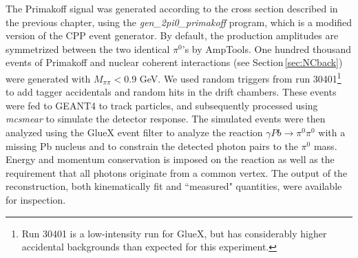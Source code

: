 The Primakoff signal was generated according to the cross section
described in the previous chapter, using the
\emph{gen\_2pi0\_primakoff} program, which is a modified version of the CPP event generator. By default, the production amplitudes are
symmetrized between the two identical $\pi^0$'s by AmpTools. One
hundred thousand events of Primakoff and nuclear coherent interactions 
(see Section\,\ref{sec:NCback}) were generated with $M_{\pi\pi}<$0.9 GeV.
We used random triggers from run 30401\footnote{Run 30401 is a low-intensity run for GlueX,
but has considerably higher accidental backgrounds than expected for this experiment.} to add tagger accidentals 
and random hits in the drift chambers. These events were fed to GEANT4 to track particles, and subsequently
processed using \emph{mcsmear} to simulate the detector response. The
simulated events were then analyzed using the GlueX event filter to
analyze the reaction $\gamma Pb \rightarrow \pi^0 \pi^0$ with a
missing Pb nucleus and to constrain the detected photon pairs to the
$\pi^0$ mass. Energy and momentum conservation is imposed on the reaction as well as the requirement that all photons originate from a common vertex. The output of the reconstruction, both kinematically
fit and ``measured" quantities, were available for inspection.


